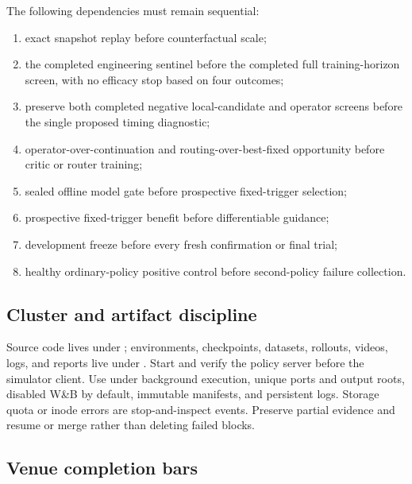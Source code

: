 The following dependencies must remain sequential:
\begin{enumerate}
  \item exact snapshot replay before counterfactual scale;
  \item the completed engineering sentinel before the completed full training-horizon screen, with no efficacy stop based on four outcomes;
  \item preserve both completed negative local-candidate and operator screens before the single proposed timing diagnostic;
  \item operator-over-continuation and routing-over-best-fixed opportunity before critic or router training;
  \item sealed offline model gate before prospective fixed-trigger selection;
  \item prospective fixed-trigger benefit before differentiable guidance;
  \item development freeze before every fresh confirmation or final trial;
  \item healthy ordinary-policy positive control before second-policy failure collection.
\end{enumerate}

\subsection{Cluster and artifact discipline}

Source code lives under ; environments, checkpoints, datasets, rollouts, videos, logs, and reports live under . Start and verify the policy server before the simulator client. Use  under background execution, unique ports and output roots, disabled W\&B by default, immutable manifests, and persistent logs. Storage quota or inode errors are stop-and-inspect events. Preserve partial evidence and resume or merge rather than deleting failed blocks.

\subsection{Venue completion bars}

